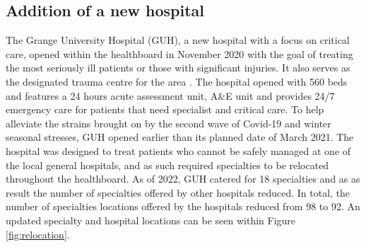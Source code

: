 \documentclass[../thesis.tex]{subfiles}
\begin{document}
\subsection{Addition of a new hospital}\label{sec:scenario1}
The Grange University Hospital (GUH), a new hospital with a focus on critical care, opened within the healthboard in November 2020 with the goal of treating the most seriously ill patients or those with significant injuries. It also serves as the designated trauma centre for the area \cite{NHSWalesa}. The hospital opened with 560 beds and features a 24 hours acute assessment unit, A\&E unit and provides 24/7 emergency care for patients that need specialist and critical care. To help alleviate the strains brought on by the second wave of Covid-19 and winter seasonal stresses, GUH opened earlier than its planned date of March 2021. The hospital was designed to treat patients who cannot be safely managed at one of the local general hospitals, and as such required specialties to be relocated throughout the healthboard. As of 2022, GUH catered for 18 specialties and as as result the number of specialties offered by other hospitals reduced. In total, the number of specialties locations offered by the hospitals reduced from 98 to 92. An updated specialty and hospital locations can be seen within Figure \ref{fig:relocation}. %
\end{document}
